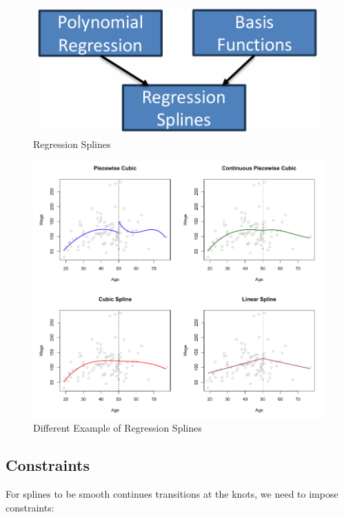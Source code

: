 \documentclass[../Main.tex]{subfiles}
\begin{document}
\begin{figure}[H]
    \centering
    \includegraphics[width=0.5\linewidth]{Images/regression-splines.png}
    \caption{Regression Splines}
\end{figure}

\begin{figure}[H]
    \centering
    \includegraphics[width=0.75\linewidth]{Images/diff-regression-splines.png}
    \caption{Different Example of Regression Splines}
\end{figure}

\subsection{Constraints}
For splines to be smooth continues transitions at the knots,
we need to impose constraints:
\end{document}
